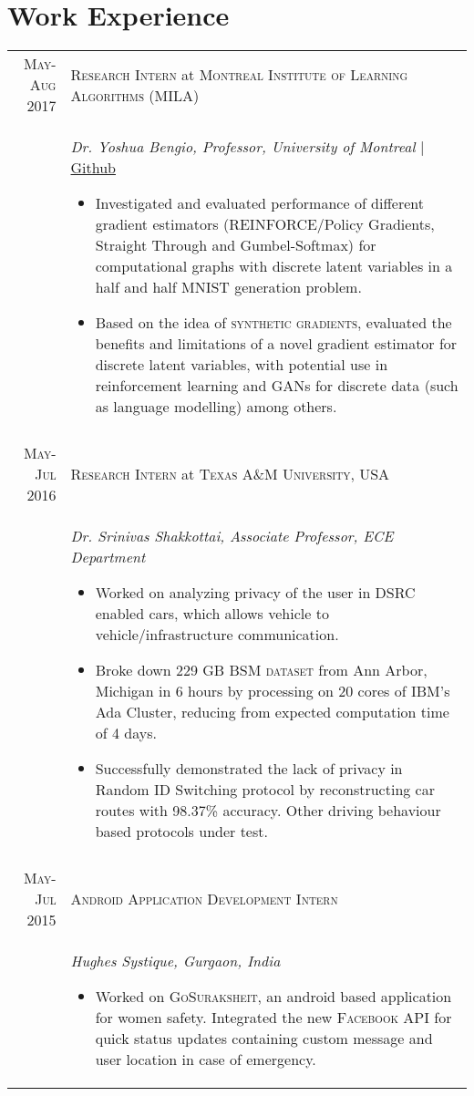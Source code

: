 \documentclass[a4paper,10pt]{article}
\begin{document}
\section{Work Experience}
\centering
\begin{longtable}{r|p{15cm}}
\textsc{May-Aug 2017} & \large \textsc{Research Intern} at \textsc{Montreal Institute of Learning Algorithms (MILA)}\\
& \textit{Dr. Yoshua Bengio, Professor, University of Montreal} | \href{https://github.com/architsharma97/MNIST}{Github}
\begin{itemize}
\item Investigated and evaluated performance of different gradient estimators (REINFORCE/Policy Gradients, Straight Through and Gumbel-Softmax) for computational graphs with discrete latent variables in a half and half MNIST generation problem.
\item Based on the idea of \textsc{synthetic gradients}, evaluated the benefits and limitations of a novel gradient estimator for discrete latent variables, with potential use in reinforcement learning and GANs for discrete data (such as language modelling) among others. 
\vspace*{-\baselineskip}
\end{itemize}
\\
\multicolumn{2}{c}{}\\
\textsc{May-Jul 2016} & \large \textsc{Research Intern} at \textsc{Texas A\&M University, USA}\\
& \textit{Dr. Srinivas Shakkottai, Associate Professor, ECE Department}
\begin{itemize}
 \item Worked on analyzing privacy of the user in DSRC enabled cars, which allows vehicle to vehicle/infrastructure communication.
 \item Broke down 229 GB \textsc{BSM dataset} from Ann Arbor, Michigan in 6 hours by processing on 20 cores of IBM's Ada Cluster, reducing from expected computation time of 4 days.
 \item Successfully demonstrated the lack of privacy in Random ID Switching protocol by reconstructing car routes with 98.37\% accuracy. Other driving behaviour based protocols under test. \vspace*{-\baselineskip}
\end{itemize}
\\
\multicolumn{2}{c}{}\\
\textsc{May-Jul 2015} & \large \textsc{Android Application Development Intern}\\
& \textit{Hughes Systique, Gurgaon, India}
\begin{itemize}
 \item Worked on \textsc{GoSuraksheit}, an android based application for women safety. Integrated the new \textsc{Facebook API} for quick status updates containing custom message and user location in case of emergency. \vspace*{-\baselineskip}
\end{itemize}\\
\end{longtable}
\end{document}
